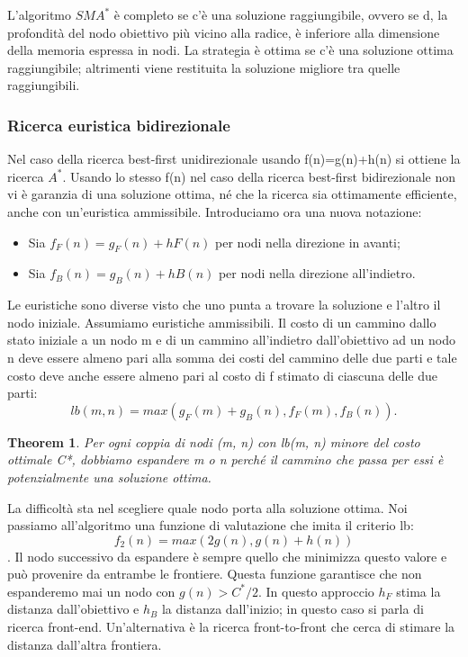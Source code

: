 \documentclass{article}
\newtheorem{theorem}{Theorem}[subsection]
\begin{document}
L'algoritmo $SMA^*$ è completo se c'è una soluzione raggiungibile, ovvero se d, la profondità del nodo obiettivo più vicino alla radice, è inferiore alla dimensione della memoria espressa in nodi. La strategia è ottima se c'è una soluzione ottima raggiungibile; altrimenti viene restituita la soluzione migliore tra quelle raggiungibili.
\newpage
\subsubsection{Ricerca euristica bidirezionale}
Nel caso della ricerca best-first unidirezionale usando f(n)=g(n)+h(n) si ottiene la ricerca $A^*$. Usando lo stesso f(n) nel caso della ricerca best-first bidirezionale non vi è garanzia di una soluzione ottima, né che la ricerca sia ottimamente efficiente, anche con un'euristica ammissibile.
Introduciamo ora una nuova notazione:
\begin{itemize}
    \item Sia $f_F (n)=g_F(n)+hF(n)$ per nodi nella direzione in avanti;
    \item Sia $f_B (n)=g_B(n)+hB(n)$ per nodi nella direzione all'indietro.
\end{itemize}

Le euristiche sono diverse visto che uno punta a trovare la soluzione e l'altro il nodo iniziale. Assumiamo euristiche ammissibili. Il costo di un cammino dallo stato iniziale a un nodo m e di un cammino all'indietro dall'obiettivo ad un nodo n deve essere almeno pari alla somma dei costi del cammino delle due parti e tale costo deve anche essere almeno pari al costo di f stimato di ciascuna delle due parti:
	$$lb(m,n)=max(g_F(m)+g_B(n),f_F(m),f_B(n)).$$
\begin{theorem}
Per ogni coppia di nodi (m, n) con lb(m, n) minore del costo ottimale C*, dobbiamo espandere m o n perché il cammino che passa per essi è potenzialmente una soluzione ottima.
\end{theorem}
\noindent La difficoltà sta nel scegliere quale nodo porta alla soluzione ottima. Noi passiamo all'algoritmo una funzione di valutazione che imita il criterio lb: $$f_2(n)=max(2g(n),g(n)+h(n))$$. Il nodo successivo da espandere è sempre quello che minimizza questo valore e può provenire da entrambe le frontiere. Questa funzione garantisce che non espanderemo mai un nodo con $g(n)>C^*/2$. 
In questo approccio $h_F$  stima la distanza dall'obiettivo e $h_B$ la distanza dall'inizio; in questo caso si parla di ricerca front-end. Un'alternativa è la ricerca front-to-front che cerca di stimare la distanza dall'altra frontiera.
\newpage
\end{document}
